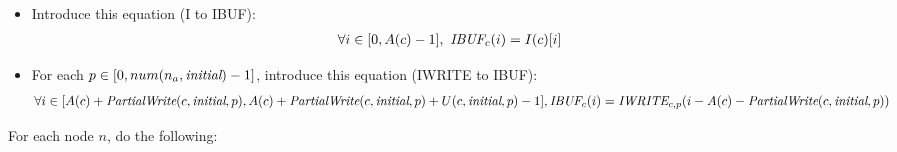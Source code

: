 \begin{itemize}
\item Introduce this equation (I to IBUF):
\begin{align*}
\forall i \in [0,A(c)-1],~\mbox{\it IBUF}_{c}(i) = I(c)[i] \\
\end{align*}

\item For each $p \in [0, num(n_a, \mbox{\it initial})-1]$, introduce this
equation (IWRITE to IBUF):
\begin{align*}
\forall i \in [A(c) + \mbox{\it PartialWrite}(c,\mbox{\it initial},p), 
               A(c) + \mbox{\it PartialWrite}(c,\mbox{\it initial},p)+U(c, \mbox{\it initial}, p)-1],
\mbox{\it IBUF}_{c}(i) = \mbox{\it IWRITE}_{c, p}(i - A(c) - \mbox{\it PartialWrite}(c,\mbox{\it initial},p)) \\
\end{align*}

\end{itemize}
For each node $n$, do the following:
